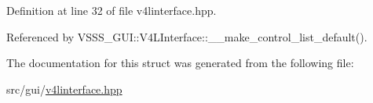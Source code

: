 Definition at line 32 of file v4linterface.\+hpp.



Referenced by V\+S\+S\+S\+\_\+\+G\+U\+I\+::\+V4\+L\+Interface\+::\+\_\+\+\_\+make\+\_\+control\+\_\+list\+\_\+default().



The documentation for this struct was generated from the following file\+:\begin{DoxyCompactItemize}
\item 
src/gui/\hyperlink{v4linterface_8hpp}{v4linterface.\+hpp}\end{DoxyCompactItemize}
